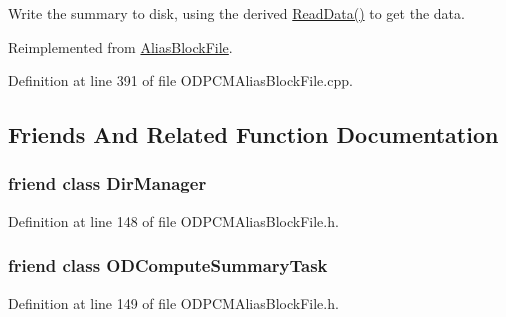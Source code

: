 Write the summary to disk, using the derived \hyperlink{class_o_d_p_c_m_alias_block_file_a52ff6c8c85016d45e39e33eea8956ba7}{Read\+Data()} to get the data. 



Reimplemented from \hyperlink{class_alias_block_file_a0ffabad5ed7a43d188d56db822a9421a}{Alias\+Block\+File}.



Definition at line 391 of file O\+D\+P\+C\+M\+Alias\+Block\+File.\+cpp.



\subsection{Friends And Related Function Documentation}
\subsubsection[{\texorpdfstring{Dir\+Manager}{DirManager}}]{\setlength{\rightskip}{0pt plus 5cm}friend class {\bf Dir\+Manager}\hspace{0.3cm}{\ttfamily [friend]}}\hypertarget{class_o_d_p_c_m_alias_block_file_a0db96e19e318fc03ec706babee75be8f}{}\label{class_o_d_p_c_m_alias_block_file_a0db96e19e318fc03ec706babee75be8f}


Definition at line 148 of file O\+D\+P\+C\+M\+Alias\+Block\+File.\+h.

\subsubsection[{\texorpdfstring{O\+D\+Compute\+Summary\+Task}{ODComputeSummaryTask}}]{\setlength{\rightskip}{0pt plus 5cm}friend class {\bf O\+D\+Compute\+Summary\+Task}\hspace{0.3cm}{\ttfamily [friend]}}\hypertarget{class_o_d_p_c_m_alias_block_file_a24c4db9b12ac4619d1b2a0966f0e756c}{}\label{class_o_d_p_c_m_alias_block_file_a24c4db9b12ac4619d1b2a0966f0e756c}


Definition at line 149 of file O\+D\+P\+C\+M\+Alias\+Block\+File.\+h.

